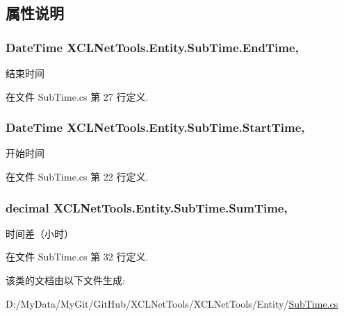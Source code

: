 \subsection{属性说明}
\hypertarget{class_x_c_l_net_tools_1_1_entity_1_1_sub_time_a286d907d4beb9e6153f1abdb6f2c95fd}{
\subsubsection[{End\-Time}]{\setlength{\rightskip}{0pt plus 5cm}Date\-Time X\-C\-L\-Net\-Tools.\-Entity.\-Sub\-Time.\-End\-Time\hspace{0.3cm}{\ttfamily [get]}, {\ttfamily [set]}}}\label{class_x_c_l_net_tools_1_1_entity_1_1_sub_time_a286d907d4beb9e6153f1abdb6f2c95fd}


结束时间 



在文件 Sub\-Time.\-cs 第 27 行定义.

\hypertarget{class_x_c_l_net_tools_1_1_entity_1_1_sub_time_a7813c7a0874535abbe0b5307d7310c27}{
\subsubsection[{Start\-Time}]{\setlength{\rightskip}{0pt plus 5cm}Date\-Time X\-C\-L\-Net\-Tools.\-Entity.\-Sub\-Time.\-Start\-Time\hspace{0.3cm}{\ttfamily [get]}, {\ttfamily [set]}}}\label{class_x_c_l_net_tools_1_1_entity_1_1_sub_time_a7813c7a0874535abbe0b5307d7310c27}


开始时间 



在文件 Sub\-Time.\-cs 第 22 行定义.

\hypertarget{class_x_c_l_net_tools_1_1_entity_1_1_sub_time_afe5aa74e0038c4b4342be84211c3f607}{
\subsubsection[{Sum\-Time}]{\setlength{\rightskip}{0pt plus 5cm}decimal X\-C\-L\-Net\-Tools.\-Entity.\-Sub\-Time.\-Sum\-Time\hspace{0.3cm}{\ttfamily [get]}, {\ttfamily [set]}}}\label{class_x_c_l_net_tools_1_1_entity_1_1_sub_time_afe5aa74e0038c4b4342be84211c3f607}


时间差（小时） 



在文件 Sub\-Time.\-cs 第 32 行定义.



该类的文档由以下文件生成\-:\begin{DoxyCompactItemize}
\item 
D\-:/\-My\-Data/\-My\-Git/\-Git\-Hub/\-X\-C\-L\-Net\-Tools/\-X\-C\-L\-Net\-Tools/\-Entity/\hyperlink{_sub_time_8cs}{Sub\-Time.\-cs}\end{DoxyCompactItemize}
